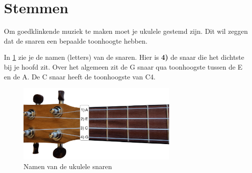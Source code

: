 \section{Stemmen}

Om goedklinkende muziek te maken moet je ukulele gestemd zijn. Dit wil zeggen dat de snaren een bepaalde toonhoogte hebben.

In \ref{fig:ukulele_string_names} zie je de namen (letters) van de snaren. Hier is \textbf{4)} de snaar die het dichtste bij je hoofd zit. Over het algemeen zit de G snaar qua toonhoogste tussen de E en de A. De C snaar heeft de toonhoogste van C4. 

\begin{figure}[h]
    \centering
    \includegraphics[width=0.7\textwidth]{image/UkuleleNeck-StringNames.png}
    \caption{Namen van de ukulele snaren}
    \label{fig:ukulele_string_names}
\end{figure}

